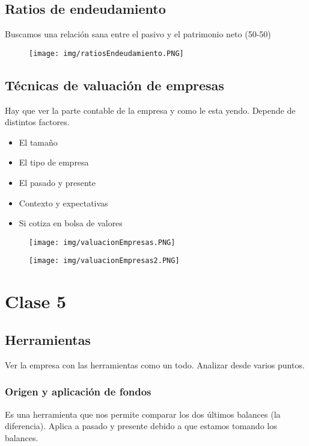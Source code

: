 \documentclass[titlepage,a4paper]{article}
\begin{document}
\subsection{Ratios de endeudamiento}
Buscamos una relación sana entre el pasivo y el patrimonio neto (50-50)

\begin{figure}[!htb]
    \centering
    \texttt{[image: img/ratiosEndeudamiento.PNG]}
\end{figure}

\subsection{Técnicas de valuación de empresas}
Hay que ver la parte contable de la empresa y como le esta yendo. Depende de distintos factores.
\begin{itemize}
\item El tamaño
\item El tipo de empresa
\item El pasado y presente
\item Contexto y expectativas
\item Si cotiza en bolsa de valores
\end{itemize}

\begin{figure}[!htb]
    \centering
    \texttt{[image: img/valuacionEmpresas.PNG]}
\end{figure}

\begin{figure}[!htb]
    \centering
    \texttt{[image: img/valuacionEmpresas2.PNG]}
\end{figure}

\newpage
\section*{Clase 5}

\subsection{Herramientas}
Ver la empresa con las herramientas como un todo. Analizar desde varios puntos.

\subsubsection*{Origen y aplicación de fondos}
Es una herramienta que nos permite comparar los dos últimos balances (la diferencia). Aplica a pasado y presente debido a que estamos tomando los balances.
\end{document}
